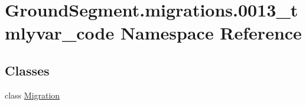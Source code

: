 \hypertarget{namespace_ground_segment_1_1migrations_1_10013__tmlyvar__code}{}\section{Ground\+Segment.\+migrations.0013\+\_\+tmlyvar\+\_\+code Namespace Reference}
\label{namespace_ground_segment_1_1migrations_1_10013__tmlyvar__code}
\subsection*{Classes}
\begin{DoxyCompactItemize}
\item 
class \hyperlink{class_ground_segment_1_1migrations_1_10013__tmlyvar__code_1_1_migration}{Migration}
\end{DoxyCompactItemize}

